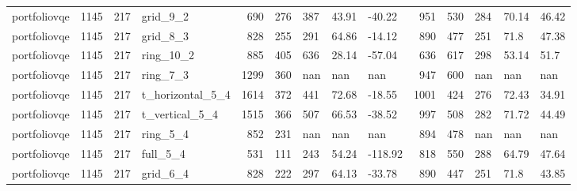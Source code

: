 \begin{longtable}{lrrlrrlllrrlll}
portfoliovqe & 1145 & 217 & grid\_9\_2 & 690 & 276 & 387 & 43.91 & -40.22 & 951 & 530 & 284 & 70.14 & 46.42 \\
portfoliovqe & 1145 & 217 & grid\_8\_3 & 828 & 255 & 291 & 64.86 & -14.12 & 890 & 477 & 251 & 71.8 & 47.38 \\
portfoliovqe & 1145 & 217 & ring\_10\_2 & 885 & 405 & 636 & 28.14 & -57.04 & 636 & 617 & 298 & 53.14 & 51.7 \\
portfoliovqe & 1145 & 217 & ring\_7\_3 & 1299 & 360 & nan & nan & nan & 947 & 600 & nan & nan & nan \\
portfoliovqe & 1145 & 217 & t\_horizontal\_5\_4 & 1614 & 372 & 441 & 72.68 & -18.55 & 1001 & 424 & 276 & 72.43 & 34.91 \\
portfoliovqe & 1145 & 217 & t\_vertical\_5\_4 & 1515 & 366 & 507 & 66.53 & -38.52 & 997 & 508 & 282 & 71.72 & 44.49 \\
portfoliovqe & 1145 & 217 & ring\_5\_4 & 852 & 231 & nan & nan & nan & 894 & 478 & nan & nan & nan \\
portfoliovqe & 1145 & 217 & full\_5\_4 & 531 & 111 & 243 & 54.24 & -118.92 & 818 & 550 & 288 & 64.79 & 47.64 \\
portfoliovqe & 1145 & 217 & grid\_6\_4 & 828 & 222 & 297 & 64.13 & -33.78 & 890 & 447 & 251 & 71.8 & 43.85 \\
\end{longtable}
